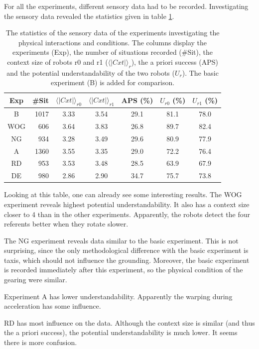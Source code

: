 For all the experiments, different sensory data had to be recorded. Investigating the sensory data revealed the statistics given in table \ref{t:par:stats}.

\begin{table}
\centering
\begin{tabular}{||c|r|c|c|c|c|c||}
\hline\hline
Exp & \#Sit & $\langle | Cxt | \rangle_{r0}$ & $\langle | Cxt | \rangle_{r1}$ & APS (\%) & $U_{r0}$ (\%) & $U_{r1}$ (\%)\\\hline
B & 1017 & 3.33 & 3.54 & 29.1 & 81.1 & 78.0\\\hline
WOG & 606 & 3.64 & 3.83 & 26.8 & 89.7 & 82.4\\\hline
NG & 934 & 3.28 & 3.49 & 29.6 & 80.9 & 77.9\\\hline
A & 1360 & 3.55 & 3.35 & 29.0 & 72.2 & 76.4\\\hline
RD & 953 & 3.53 & 3.48 & 28.5 & 63.9 & 67.9\\\hline
DE & 980 & 2.86 & 2.90 & 34.7 & 75.7 & 73.8\\\hline
\hline
\end{tabular}
\caption{The statistics of the sensory data of the experiments investigating the physical interactions and conditions. The columns display the experiments (Exp), the number of situations recorded (\#Sit), the context size of robots r0 and r1 ($\langle | Cxt | \rangle_{r}$), the a priori success (APS) and the potential understandability of the two robots ($U_{r}$). The basic experiment (B) is added for comparison.}
\label{t:par:stats}
\end{table}


Looking at this table, one can already see some interesting results. The WOG experiment reveals highest potential understandability. It also has a context size closer to 4 than in the other experiments. Apparently, the robots detect the four referents better when they rotate slower. 

The NG experiment reveals data similar to the basic experiment. This is not surprising, since the only methodological difference with the basic experiment is taxis, which should not influence the grounding. Moreover, the basic experiment is recorded immediately after this experiment, so the physical condition of the gearing were similar.

Experiment A has lower understandability. Apparently the warping during acceleration has some influence.

RD has most influence on the data. Although the context size is similar (and thus the a priori success), the potential understandability is much lower. It seems there is more confusion.

